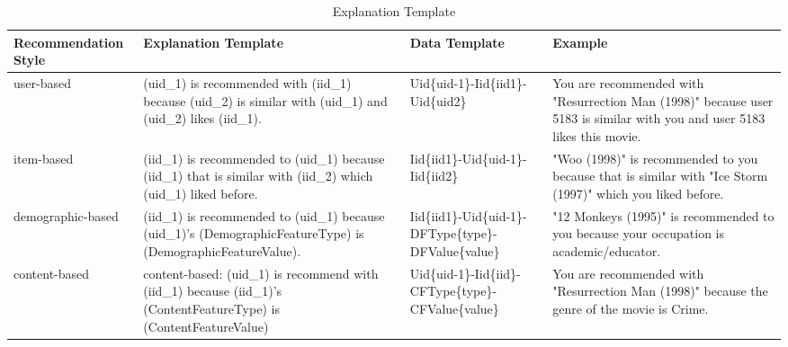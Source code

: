 \begin{table}[h!]
\renewcommand\arraystretch{1.5}
\centering
\begin{tabular}{p{80pt}p{120pt}p{100pt}p{120pt}}\toprule
 \hline
 Recommendation Style & Explanation Template & Data Template & Example \\ [0.5ex] 
 \hline\hline
 user-based & (uid\_1) is recommended with (iid\_1) because (uid\_2) is similar with (uid\_1) and (uid\_2) likes (iid\_1). & Uid\{uid-1\}-Iid\{iid1\}-Uid\{uid2\} & You are recommended with "Resurrection Man (1998)" because user 5183 is similar with you and user 5183 likes this movie.\\ 
 item-based & (iid\_1) is recommended to (uid\_1) because (iid\_1) that is similar with (iid\_2) which (uid\_1) liked before. & Iid\{iid1\}-Uid\{uid-1\}-Iid\{iid2\} & "Woo (1998)" is recommended to you because that is similar with "Ice Storm (1997)" which you liked before. \\
 demographic-based & (iid\_1) is recommended to (uid\_1) because (uid\_1)'s (DemographicFeatureType) is (DemographicFeatureValue). & Iid\{iid1\}-Uid\{uid-1\}-DFType\{type\}-DFValue\{value\} & "12 Monkeys (1995)" is recommended to you because your occupation is academic/educator. \\
 content-based & content-based: (uid\_1) is recommend with (iid\_1) because (iid\_1)'s (ContentFeatureType) is (ContentFeatureValue) & Uid\{uid-1\}-Iid\{iid\}-CFType\{type\}-CFValue\{value\} & You are recommended with "Resurrection Man (1998)" because the genre of the movie is Crime.\\ [1ex] 
 \hline
\end{tabular}
\caption{Explanation Template}
\label{table:2}
\end{table}

